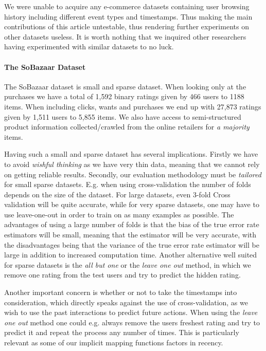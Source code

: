 We were unable to acquire any e-commerce datasets containing user browsing history including different event types
and timestamps. Thus making the main contributions of this article untestable, thus rendering further experiments
on other datasets useless. It is worth nothing that we inquired other researchers having
experimented with similar datasets to no luck.

\paragraph{The SoBazaar Dataset}

The SoBazaar dataset is small and sparse dataset. When looking only at the purchases
we have a total of 1,592 binary ratings given by 466 users to 1188 items. When including
clicks, wants and purchases we end up with 27,873 ratings given by 1,511 users to 5,855 items.
We also have access to semi-structured product information collected/crawled from
the online retailers for \emph{a majority} items.

Having such a small and sparse dataset has several implications. Firstly we have
to avoid \emph{wishful thinking} as we have very thin data, meaning that we cannot
rely on getting reliable results. Secondly, our evaluation methodology must be
\emph{tailored} for small sparse datasets. E.g. when using cross-validation the number
of folds depends on the size of the dataset. For large datasets, even 3-fold Cross
validation will be quite accurate, while for very sparse datasets, one may have to
use leave-one-out in order to train on as many examples as possible. The advantages
of using a large number of folds is that the bias of the true error rate estimators
will be small, meaning that the estimator will be very accurate, with the disadvantages being that
the variance of the true error rate estimator will be large in addition to increased
computation time. Another alternative well suited for sparse datasets is the
\emph{all but one} or the \emph{leave one out} method, in which we remove one rating
from the test users and try to predict the hidden rating.

Another important concern is whether or not to take the timestamps into consideration,
which directly speaks against the use of cross-validation, as we wish to use the past
interactions to predict future actions. When using the \emph{leave one out} method one
could e.g. always remove the users freshest rating and try to predict it and repeat the
process any number of times. This is particularly relevant as some of our implicit mapping functions
factors in recency.

